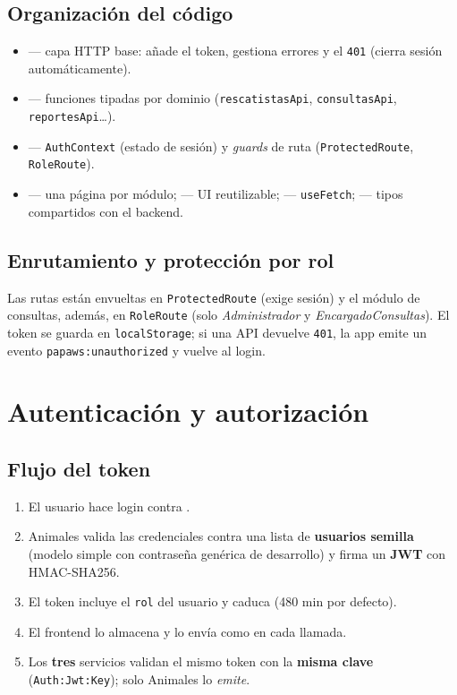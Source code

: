 \documentclass[11pt,a4paper]{article}
\begin{document}
\subsection{Organización del código}
\begin{itemize}[leftmargin=1.4em]
  \item {} — capa HTTP base: añade el token, gestiona errores y
        el \texttt{401} (cierra sesión automáticamente).
  \item {} — funciones tipadas por dominio
        (\texttt{rescatistasApi}, \texttt{consultasApi}, \texttt{reportesApi}\ldots).
  \item {} — \texttt{AuthContext} (estado de sesión) y \emph{guards}
        de ruta (\texttt{ProtectedRoute}, \texttt{RoleRoute}).
  \item {} — una página por módulo;  — UI
        reutilizable;  — \texttt{useFetch};  —
        tipos compartidos con el backend.
\end{itemize}

\subsection{Enrutamiento y protección por rol}
Las rutas están envueltas en \texttt{ProtectedRoute} (exige sesión) y el módulo de
consultas, además, en \texttt{RoleRoute} (solo \emph{Administrador} y
\emph{EncargadoConsultas}). El token se guarda en \texttt{localStorage}; si una API
devuelve \texttt{401}, la app emite un evento \texttt{papaws:unauthorized} y vuelve
al login.

\section{Autenticación y autorización}

\subsection{Flujo del token}
\begin{enumerate}[leftmargin=1.6em]
  \item El usuario hace login contra .
  \item Animales valida las credenciales contra una lista de \textbf{usuarios
        semilla} (modelo simple con contraseña genérica de desarrollo) y firma un
        \textbf{JWT} con HMAC-SHA256.
  \item El token incluye el \texttt{rol} del usuario y caduca (480 min por defecto).
  \item El frontend lo almacena y lo envía como 
        en cada llamada.
  \item Los \textbf{tres} servicios validan el mismo token con la \textbf{misma
        clave} (\texttt{Auth:Jwt:Key}); solo Animales lo \emph{emite}.
\end{enumerate}
\end{document}
